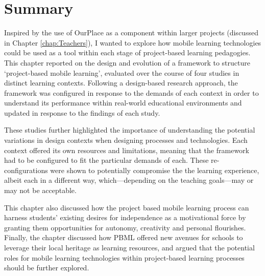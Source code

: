 \section{Summary}
Inspired by the use of OurPlace as a component within larger projects (discussed in Chapter \ref{chap:Teachers}), I wanted to explore how mobile learning technologies could be used as a tool within each stage of project-based learning pedagogies. This chapter reported on the design and evolution of a framework to structure `project-based mobile learning', evaluated over the course of four studies in distinct learning contexts. Following a design-based research approach, the framework was configured in response to the demands of each context in order to understand its performance within real-world educational environments and updated in response to the findings of each study.

These studies further highlighted the importance of understanding the potential variations in design contexts when designing processes and technologies. Each context offered its own resources and limitations, meaning that the framework had to be configured to fit the particular demands of each. These re-configurations were shown to potentially compromise the the learning experience, albeit each in a different way, which---depending on the teaching goals---may or may not be acceptable.

This chapter also discussed how the project based mobile learning process can harness students' existing desires for independence as a motivational force by granting them opportunities for autonomy, creativity and personal flourishes. Finally, the chapter discussed how PBML offered new avenues for schools to leverage their local heritage as learning resources, and argued that the potential roles for mobile learning technologies within project-based learning processes should be further explored.

